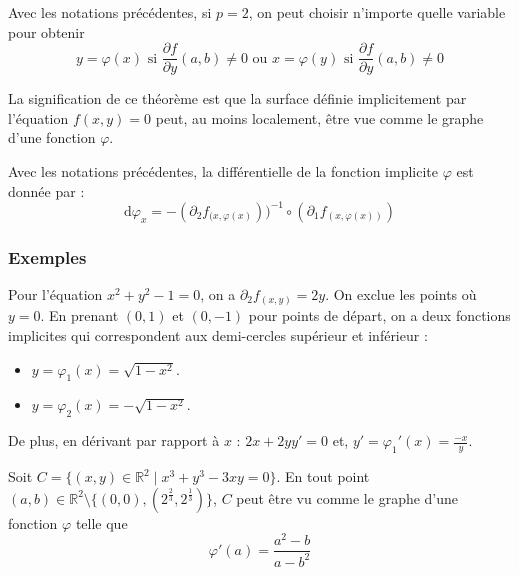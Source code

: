 	
	\begin{remark}
		Avec les notations précédentes, si $p = 2$, on peut choisir n'importe quelle variable pour obtenir
		\[ y = \varphi(x) \text{ si } \frac{\partial f}{\partial y}(a,b) \neq 0 \text{ ou } x = \varphi(y) \text{ si } \frac{\partial f}{\partial y}(a,b) \neq 0 \]
	\end{remark}
	
	
	\begin{remark}
		La signification de ce théorème est que la surface définie implicitement par l'équation $f(x,y)=0$ peut, au moins localement, être vue comme le graphe d'une fonction $\varphi$.
	\end{remark}
	
	\begin{proposition}
		Avec les notations précédentes, la différentielle de la fonction implicite $\varphi$ est donnée par :
		\[ \mathrm{d}\varphi_x = -(\partial_2 f_{(x, \varphi(x)}))^{-1} \circ (\partial_1 f_{(x, \varphi(x))}) \]
	\end{proposition}
	
	\subsubsection{Exemples}
	
	\begin{example}
		Pour l'équation $x^2 + y^2 - 1 = 0$, on a $\partial_2 f_{(x,y)} = 2y$. On exclue les points où $y = 0$. En prenant $(0,1)$ et $(0,-1)$ pour points de départ, on a deux fonctions implicites qui correspondent aux demi-cercles supérieur et inférieur :
		\begin{itemize}
			\item $y = \varphi_1(x) = \sqrt{1-x^2}$.
			\item $y = \varphi_2(x) = -\sqrt{1-x^2}$.
		\end{itemize}
		De plus, en dérivant par rapport à $x$ : $2x + 2yy' = 0$ et, $y' = \varphi_1'(x) = \frac{-x}{y}$.
	\end{example}
	
	
	\begin{example}
		Soit $C = \{ (x,y) \in \mathbb{R}^2 \mid x^3 + y^3 - 3xy = 0 \}$. En tout point $(a,b) \in \mathbb{R}^2 \setminus \{ (0,0), (2^{\frac{2}{3}}, 2^{\frac{1}{3}}) \}$, $C$ peut être vu comme le graphe d'une fonction $\varphi$ telle que
		\[ \varphi'(a) = \frac{a^2-b}{a-b^2} \]
	\end{example}
	

